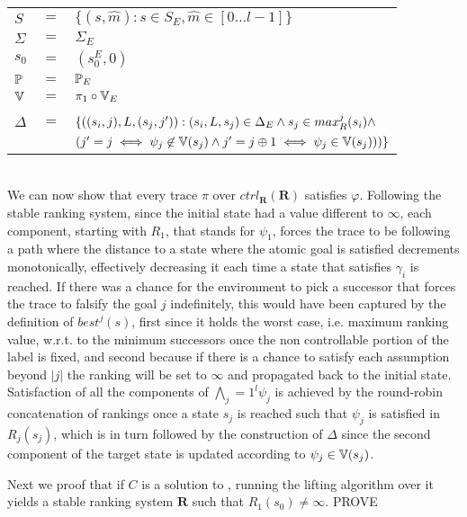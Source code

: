 \vspace{1em}
\begin{tabular}{ l c l }
	$S$ &$=$& $\{(s,\hat{m}) : s \in S_E, \hat{m} \in [0\ldots l-1] \}$\\
	$\Sigma$ &$=$&$\Sigma_E$\\	
	$s_0$&$=$&$(s_0^{E}, 0)$\\
	$\mathbb{P}$&$=$&$\mathbb{P}_E$\\	
	$\mathbb{V}$&$=$&$\pi_1 \circ \mathbb{V}_E$\\
	&&\\
	$\Delta$&$=$&$\{((s_i,j),L,(s_j,j')): (s_i,L,s_j) \in \Delta_E \wedge s_j \in max_{R}^j(s_i) \wedge$\\
	&&$(j' = j \iff \psi_j \not\in \mathbb{V}(s_j) \wedge j' = j \oplus 1 \iff \psi_j \in \mathbb{V}(s_j)))\}$\\
\end{tabular}
\vspace{1em}
\\

We can now show that every trace $\pi$ over $ctrl_{\mathbf{R}}(\mathbf{R})$ satisfies $\varphi$. Following the stable ranking system, since the initial state had a value different to $\infty$, each component, starting with $R_1$, that stands for $\psi_1$, forces the trace to be following a path where the distance to a state where the atomic goal is satisfied decrements monotonically, effectively decreasing it each time a state that satisfies $\gamma_i$ is reached. If there was a chance for the environment to pick a successor that forces the trace to falsify the goal $j$ indefinitely, this would have been captured by the definition of $best^j(s)$, first since it holds the worst case, i.e. maximum ranking value, w.r.t. to the minimum successors once the non controllable portion of the label is fixed, and second because if there is a chance to satisfy each assumption beyond $|j|$ the ranking will be set to $\infty$ and propagated back to the initial state. Satisfaction of all the components of $\bigwedge_j=1^l \psi_j$ is achieved by the round-robin concatenation of rankings once a state $s_j$ is reached such that $\psi_j$ is satisfied in $R_j(s_j)$, which is in turn followed by the construction of $\Delta$ since the second component of the target state is updated according to $\psi_j \in \mathbb{V}(s_j)$.

Next we proof that if $C$ is a solution to \controlProblem, running the lifting algorithm over it yields a stable ranking system $\mathbf{R}$ such that $R_1(s_0) \neq \infty$. PROVE